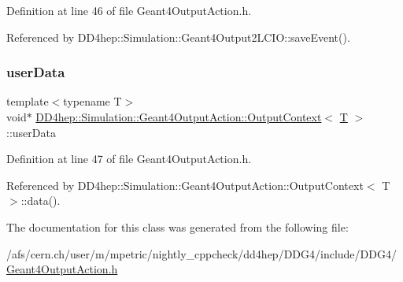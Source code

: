 Definition at line 46 of file Geant4\+Output\+Action.\+h.



Referenced by D\+D4hep\+::\+Simulation\+::\+Geant4\+Output2\+L\+C\+I\+O\+::save\+Event().

\hypertarget{class_d_d4hep_1_1_simulation_1_1_geant4_output_action_1_1_output_context_aac8a4f21a40d123eedfffecd9b6ea96a}{}\label{class_d_d4hep_1_1_simulation_1_1_geant4_output_action_1_1_output_context_aac8a4f21a40d123eedfffecd9b6ea96a} 
\subsubsection{\texorpdfstring{user\+Data}{userData}}
{\footnotesize\ttfamily template$<$typename T$>$ \\
void$\ast$ \hyperlink{class_d_d4hep_1_1_simulation_1_1_geant4_output_action_1_1_output_context}{D\+D4hep\+::\+Simulation\+::\+Geant4\+Output\+Action\+::\+Output\+Context}$<$ \hyperlink{class_t}{T} $>$\+::user\+Data}



Definition at line 47 of file Geant4\+Output\+Action.\+h.



Referenced by D\+D4hep\+::\+Simulation\+::\+Geant4\+Output\+Action\+::\+Output\+Context$<$ T $>$\+::data().



The documentation for this class was generated from the following file\+:\begin{DoxyCompactItemize}
\item 
/afs/cern.\+ch/user/m/mpetric/nightly\+\_\+cppcheck/dd4hep/\+D\+D\+G4/include/\+D\+D\+G4/\hyperlink{_geant4_output_action_8h}{Geant4\+Output\+Action.\+h}\end{DoxyCompactItemize}
